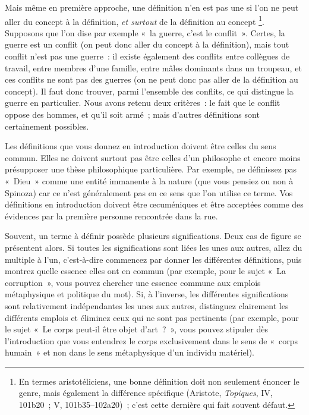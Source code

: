 \documentclass[a4paper]{article}
\begin{document}
Mais même en première approche, une définition n'en est pas une si l'on
ne peut aller du concept à la définition, \emph{et surtout} de la définition
au concept \footnote{En termes aristotéliciens, une bonne définition doit non seulement
    énoncer le genre, mais également la différence spécifique (Aristote,
    \emph{Topiques}, IV, 101b20 ; V, 101b35--102a20) ; c'est cette dernière
    qui fait souvent défaut.
 }. Supposons que l'on dise par exemple « la guerre, c'est le
conflit ». Certes, la guerre est un conflit (on peut donc aller du
concept à la définition), mais tout conflit n'est pas une guerre : il
existe également des conflits entre collègues de travail, entre membres
d'une famille, entre mâles dominants dans un troupeau, et ces conflits
ne sont pas des guerres (on ne peut donc pas aller de la définition au
concept). Il faut donc trouver, parmi l'ensemble des conflits, ce qui
distingue la guerre en particulier. Nous avons retenu deux critères : le
fait que le conflit oppose des hommes, et qu'il soit armé ; mais
d'autres définitions sont certainement possibles.

Les définitions que vous donnez en introduction doivent être celles du
sens commun. Elles ne doivent surtout pas être celles d'un philosophe et
encore moins présupposer une thèse philosophique particulière. Par
exemple, ne définissez pas « Dieu » comme une entité immanente à la nature
(que vous pensiez ou non à Spinoza) car ce n'est généralement pas en ce
sens que l'on utilise ce terme. Vos définitions en introduction doivent
être œcuméniques et être acceptées comme des évidences par la première
personne rencontrée dans la rue.

Souvent, un terme à définir possède plusieurs significations. Deux cas
de figure se présentent alors. Si toutes les significations sont liées
les unes aux autres, allez du multiple à l'un, c'est-à-dire commencez
par donner les différentes définitions, puis montrez quelle essence
elles ont en commun (par exemple, pour le sujet « La corruption », vous
pouvez chercher une essence commune aux emplois métaphysique et
politique du mot). Si, à l'inverse, les différentes significations sont
relativement indépendantes les unes aux autres, distinguez clairement
les différents emplois et éliminez ceux qui ne sont pas pertinents (par
exemple, pour le sujet « Le corps peut-il être objet d'art ? », vous
pouvez stipuler dès l'introduction que vous entendrez le corps
exclusivement dans le sens de « corps humain » et non dans le sens
métaphysique d'un individu matériel).
\end{document}
